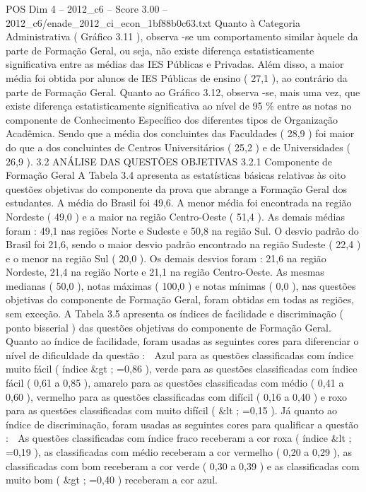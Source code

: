 \begin{textsample}{POS Dim 4 – 2012\_c6 – Score 3.00 – 2012\_c6/enade\_2012\_ci\_econ\_1bf88b0c63.txt}
Quanto à Categoria Administrativa ( Gráfico 3.11 ), observa -se um comportamento similar àquele da parte de Formação Geral, ou seja, não existe diferença estatisticamente significativa entre as médias das IES Públicas e Privadas.
Além disso, a maior média foi obtida por alunos de IES Públicas de ensino ( 27,1 ), ao contrário da parte de Formação Geral.
Quanto ao Gráfico 3.12, observa -se, mais uma vez, que existe diferença estatisticamente significativa ao nível de 95 \% entre as notas no componente de Conhecimento Específico dos diferentes tipos de Organização Acadêmica.
Sendo que a média dos concluintes das Faculdades ( 28,9 ) foi maior do que a dos concluintes de Centros Universitários ( 25,2 ) e de Universidades ( 26,9 ). 3.2 ANÁLISE DAS QUESTÕES OBJETIVAS 3.2.1 Componente de Formação Geral A Tabela 3.4 apresenta as estatísticas básicas relativas às oito questões objetivas do componente da prova que abrange a Formação Geral dos estudantes.
A média do Brasil foi 49,6.
A menor média foi encontrada na região Nordeste ( 49,0 ) e a maior na região Centro-Oeste ( 51,4 ).
As demais médias foram : 49,1 nas regiões Norte e Sudeste e 50,8 na região Sul.
O desvio padrão do Brasil foi 21,6, sendo o maior desvio padrão encontrado na região Sudeste ( 22,4 ) e o menor na região Sul ( 20,0 ).
Os demais desvios foram : 21,6 na região Nordeste, 21,4 na região Norte e 21,1 na região Centro-Oeste.
As mesmas medianas ( 50,0 ), notas máximas ( 100,0 ) e notas mínimas ( 0,0 ), nas questões objetivas do componente de Formação Geral, foram obtidas em todas as regiões, sem exceção.
A Tabela 3.5 apresenta os índices de facilidade e discriminação ( ponto bisserial ) das questões objetivas do componente de Formação Geral.
Quanto ao índice de facilidade, foram usadas as seguintes cores para diferenciar o nível de dificuldade da questão :  Azul para as questões classificadas com índice muito fácil ( índice \&gt ; =0,86 ), verde para as questões classificadas com índice fácil ( 0,61 a 0,85 ), amarelo para as questões classificadas com médio ( 0,41 a 0,60 ), vermelho para as questões classificadas com difícil ( 0,16 a 0,40 ) e roxo para as questões classificadas com muito difícil ( \&lt ; =0,15 ).
Já quanto ao índice de discriminação, foram usadas as seguintes cores para qualificar a questão :  As questões classificadas com índice fraco receberam a cor roxa ( índice \&lt ; =0,19 ), as classificadas com médio receberam a cor vermelho ( 0,20 a 0,29 ), as classificadas com bom receberam a cor verde ( 0,30 a 0,39 ) e as classificadas com muito bom ( \&gt ; =0,40 ) receberam a cor azul.

\end{textsample}
